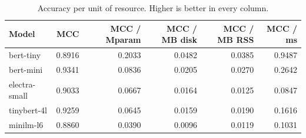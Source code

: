 \begin{table}[htbp]
\centering
\caption{Accuracy per unit of resource. Higher is better in every column.}
\label{tab:efficiency}
\small
\begin{tabular}{lrrrrr}
\toprule
Model & MCC & MCC / Mparam & MCC / MB disk & MCC / MB RSS & MCC / ms \\
\midrule
bert-tiny & 0.8916 & 0.2033 & 0.0482 & 0.0385 & 0.9487 \\
bert-mini & 0.9341 & 0.0836 & 0.0205 & 0.0270 & 0.2642 \\
electra-small & 0.9033 & 0.0667 & 0.0164 & 0.0125 & 0.0847 \\
tinybert-4l & 0.9259 & 0.0645 & 0.0159 & 0.0190 & 0.1616 \\
minilm-l6 & 0.8860 & 0.0390 & 0.0096 & 0.0119 & 0.1031 \\
\bottomrule
\end{tabular}
\end{table}
